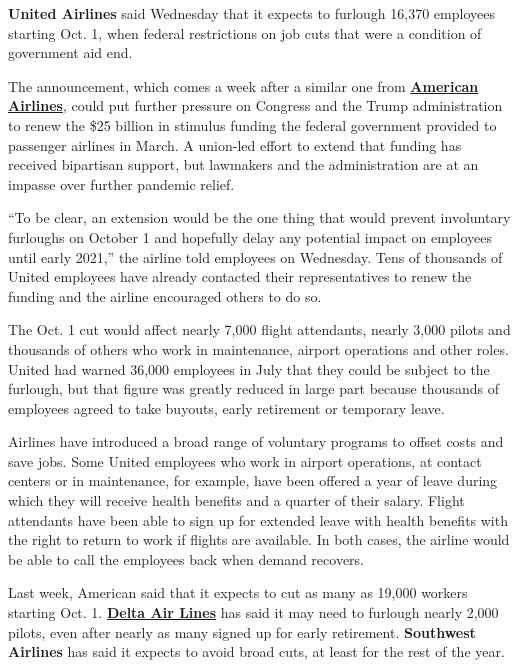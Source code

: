 \textbf{United Airlines} said Wednesday that it expects to furlough
16,370 employees starting Oct. 1, when federal restrictions on job cuts
that were a condition of government aid end.

The announcement, which comes a week after a similar one from
\textbf{\href{https://www.nytimes3xbfgragh.onion/2020/08/25/business/american-airline-furlough-19000.html}{American
Airlines}}, could put further pressure on Congress and the Trump
administration to renew the \$25 billion in stimulus funding the federal
government provided to passenger airlines in March. A union-led effort
to extend that funding has received bipartisan support, but lawmakers
and the administration are at an impasse over further pandemic relief.

``To be clear, an extension would be the one thing that would prevent
involuntary furloughs on October 1 and hopefully delay any potential
impact on employees until early 2021,'' the airline told employees on
Wednesday. Tens of thousands of United employees have already contacted
their representatives to renew the funding and the airline encouraged
others to do so.

The Oct. 1 cut would affect nearly 7,000 flight attendants, nearly 3,000
pilots and thousands of others who work in maintenance, airport
operations and other roles. United had warned 36,000 employees in July
that they could be subject to the furlough, but that figure was greatly
reduced in large part because thousands of employees agreed to take
buyouts, early retirement or temporary leave.

Airlines have introduced a broad range of voluntary programs to offset
costs and save jobs. Some United employees who work in airport
operations, at contact centers or in maintenance, for example, have been
offered a year of leave during which they will receive health benefits
and a quarter of their salary. Flight attendants have been able to sign
up for extended leave with health benefits with the right to return to
work if flights are available. In both cases, the airline would be able
to call the employees back when demand recovers.

Last week, American said that it expects to cut as many as 19,000
workers starting Oct. 1.
\textbf{\href{https://www.nytimes3xbfgragh.onion/live/2020/08/24/business/stock-market-today-coronavirus/delta-says-it-will-need-to-furlough-2000-pilots-in-october}{Delta
Air Lines}} has said it may need to furlough nearly 2,000 pilots, even
after nearly as many signed up for early retirement. \textbf{Southwest
Airlines} has said it expects to avoid broad cuts, at least for the rest
of the year.

